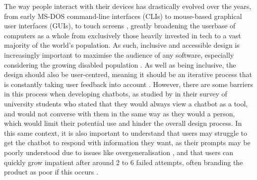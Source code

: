 \documentclass[12pt]{report}
\begin{document}
    The way people interact with their devices has drastically evolved over the years, from early MS-DOS command-line 
    interfaces (CLIs) to mouse-based graphical user interfaces (GUIs), to touch screens \autocite{kotian_systematic_2024}, greatly broadening
    the userbase of computers as a whole from exclusively those heavily invested in tech to a vast majority of the world's 
    population. As such, inclusive and accessible design is increasingly important to maximise the audience of any software,
    especially considering the growing disabled population \autocite{putnam_how_2012}. As well as being inclusive, the design 
    should also be user-centred, meaning it should be an iterative process that is constantly taking user feedback 
    into account \autocite{chammas_closer_2015}. However, there are some barriers in this process when developing 
    chatbots, as studied by \textcite{clark_what_2019} in their survey of university students who stated that they would 
    always view a chatbot as a tool, and would not converse with them in the same way as they would a person, which would 
    limit their potential use and hinder the overall design process. 
    In this same context, it is also important to understand that users may struggle
    to get the chatbot to respond with information they want, as their prompts may be poorly understood
    due to issues like overgeneralisation \autocite{zamfirescu-pereira_why_2023}, and that users can quickly 
    grow impatient after around 2 to 6 failed attempts, often branding the product as poor if this occurs \autocite{luger_like_2016}.


    
    
\end{document}
